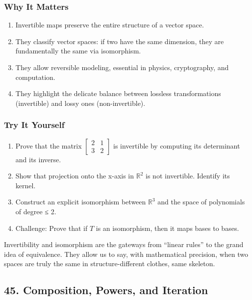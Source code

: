 \documentclass[
  letterpaper,
  DIV=11,
  numbers=noendperiod]{scrreprt}
\providecommand{\tightlist}{%
  \setlength{\itemsep}{0pt}\setlength{\parskip}{0pt}}
\begin{document}
\subsubsection{Why It Matters}\label{why-it-matters-40}

\begin{enumerate}
\def\labelenumi{\arabic{enumi}.}
\tightlist
\item
  Invertible maps preserve the entire structure of a vector space.
\item
  They classify vector spaces: if two have the same dimension, they are
  fundamentally the same via isomorphism.
\item
  They allow reversible modeling, essential in physics, cryptography,
  and computation.
\item
  They highlight the delicate balance between lossless transformations
  (invertible) and lossy ones (non-invertible).
\end{enumerate}

\subsubsection{Try It Yourself}\label{try-it-yourself-43}

\begin{enumerate}
\def\labelenumi{\arabic{enumi}.}
\tightlist
\item
  Prove that the matrix \(\begin{bmatrix} 2 & 1 \\ 3 & 2 \end{bmatrix}\)
  is invertible by computing its determinant and its inverse.
\item
  Show that projection onto the x-axis in \(\mathbb{R}^2\) is not
  invertible. Identify its kernel.
\item
  Construct an explicit isomorphism between \(\mathbb{R}^3\) and the
  space of polynomials of degree ≤ 2.
\item
  Challenge: Prove that if \(T\) is an isomorphism, then it maps bases
  to bases.
\end{enumerate}

Invertibility and isomorphism are the gateways from ``linear rules'' to
the grand idea of equivalence. They allow us to say, with mathematical
precision, when two spaces are truly the same in structure-different
clothes, same skeleton.

\subsection{45. Composition, Powers, and
Iteration}\label{composition-powers-and-iteration}
\end{document}
